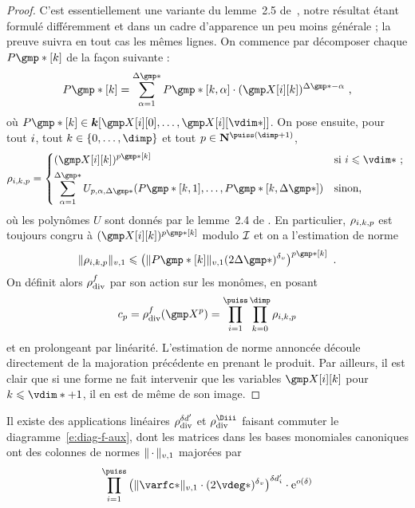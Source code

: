 \begin{proof}
  C'est essentiellement une variante du lemme~2.5 de~\cite{remivg}, notre
  résultat étant formulé différemment et dans un cadre d'apparence un peu
  moins générale ; la preuve suivra en tout cas les mêmes lignes. On commence
  par décomposer chaque \( P\mexp*[\ind] \) de la façon suivante :
  \begin{equation}
    P\mexp*[\ind]
    =
    \sum _{\alpha=1}^{\Delta\mexp*}
    P\mexp*[\ind, \alpha] \cdot (\cmh\fct[\ind])^{\Delta\mexp* - \alpha}
    \pmm,
  \end{equation}
  où \( P\mexp*[\ind] \in \cdn [ \cmh\fct[0], \dots, \cmh\fct[\vdim*] ] \).
  On pose ensuite, pour tout \( i \), tout
  \( \ind \in \{ 0, \dots, \dimp \} \) et tout
  \( p \in \N^{\puiss(\dimp+1)} \),
  \begin{equation}
    \rho_{\fct, \ind, p}
    =
    \begin{dcases*}
      ( \cmh\fct[\ind] ) ^{p\mexp*[\ind]}
      & si \( \fct \le \vdim* \) ;
      \\
      \sum _{\alpha=1}^{\Delta\mexp*}
      U_{p, \alpha, \Delta\mexp*}
      ( P\mexp*[\ind, 1], \dots, P\mexp*[\ind, \Delta\mexp*] )
      & sinon,
    \end{dcases*}
  \end{equation}
  où les polynômes \( U \) sont donnés par le lemme~2.4 de \cite{remivg}. En
  particulier, \( \rho_{i, k, p} \) est toujours congru à
  \( ( \cmh\fct[\ind] ) ^{p\mexp*[\ind]} \) modulo \( \mathcal I \) et on a
  l'estimation de norme
  \begin{equation}
    \nv1{ \rho_{\fct, \ind, p} }
    \le
    \left(
    \nv1{ P\mexp*[\ind] } (2\Delta\mexp*)^\dv
    \right) ^{p\mexp*[\ind]}
    \pmm.
  \end{equation}
  On définit alors \( \rho\sb{\mathrm{div }}^f \) par son action sur les monômes, en posant
  \begin{equation}
    c_p
    = \rdiv^f(\cmmh^p)
    = \prod\fctrange \prod\indrange \rho_{\fct, \ind, p}
  \end{equation}
  et en prolongeant par linéarité. L'estimation de norme annoncée découle
  directement de la majoration précédente en prenant le produit. Par ailleurs,
  il est clair que si une forme ne fait intervenir que les variables \(
  \cmh\fct[\ind] \) pour \( \ind \le \vdim* + 1 \), il en est de même de son
  image.
\end{proof}

\begin{coro} \label{c:hmat-rdiv}
  Il existe des applications linéaires \( \rho\sb{\mathrm{div }}^{\delta d'} \) et \( \rdiv^\Diii \)
  faisant commuter le diagramme~\eqref{e:diag-f-aux}, dont les matrices dans
  les bases monomiales canoniques ont des colonnes de normes \( \lVert{\,\cdot\,}\rVert\sb{v, 1} \)
  majorées par
  \begin{equation}
    \prod\fctrange \left(
    \nv1{ \varfc* }
    \cdot ( 2 \vdeg* )^\dv
    \right) ^{ \delta d'_\fct }
    \cdot \expb^{ o(\delta) }
  \end{equation}
\end{coro}

